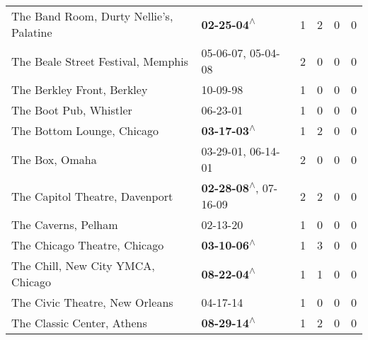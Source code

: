 \begin{supertabular}{p{0.4\textwidth}p{0.3\textwidth}p{0.05\textwidth}p{0.05\textwidth}p{0.05\textwidth}p{0.05\textwidth}}
                                      The Band Room, Durty Nellie's, Palatine &                                                 \textbf{02-25-04\textsuperscript{$\wedge$}} &  1 &  2 &  0 &  0 \\
                                           The Beale Street Festival, Memphis &                                      05-06-07\textsuperscript{}, 05-04-08\textsuperscript{} &  2 &  0 &  0 &  0 \\
                                                   The Berkley Front, Berkley &                                                                  10-09-98\textsuperscript{} &  1 &  0 &  0 &  0 \\
                                                       The Boot Pub, Whistler &                                                                  06-23-01\textsuperscript{} &  1 &  0 &  0 &  0 \\
                                                   The Bottom Lounge, Chicago &                                                 \textbf{03-17-03\textsuperscript{$\wedge$}} &  1 &  2 &  0 &  0 \\
                                                               The Box, Omaha &                                      03-29-01\textsuperscript{}, 06-14-01\textsuperscript{} &  2 &  0 &  0 &  0 \\
                                               The Capitol Theatre, Davenport &                     \textbf{02-28-08\textsuperscript{$\wedge$}}, 07-16-09\textsuperscript{} &  2 &  2 &  0 &  0 \\
                                                          The Caverns, Pelham &                                                                  02-13-20\textsuperscript{} &  1 &  0 &  0 &  0 \\
                                                 The Chicago Theatre, Chicago &                                                 \textbf{03-10-06\textsuperscript{$\wedge$}} &  1 &  3 &  0 &  0 \\
                                            The Chill, New City YMCA, Chicago &                                                 \textbf{08-22-04\textsuperscript{$\wedge$}} &  1 &  1 &  0 &  0 \\
                                               The Civic Theatre, New Orleans &                                                                  04-17-14\textsuperscript{} &  1 &  0 &  0 &  0 \\
                                                   The Classic Center, Athens &                                                 \textbf{08-29-14\textsuperscript{$\wedge$}} &  1 &  2 &  0 &  0 \\

\end{supertabular}

